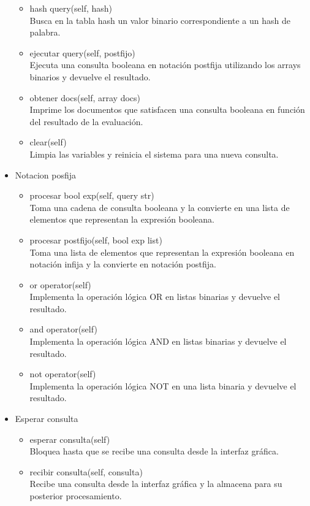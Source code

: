 \begin{itemize}
\begin{itemize}
    \item hash query(self, hash) \\ Busca en la tabla hash un valor binario correspondiente a un hash de palabra.
    \item ejecutar query(self, postfijo) \\ Ejecuta una consulta booleana en notación postfija utilizando los arrays binarios y devuelve el resultado.
    \item obtener docs(self, array docs) \\ Imprime los documentos que satisfacen una consulta booleana en función del resultado de la evaluación.
    \item clear(self) \\ Limpia las variables y reinicia el sistema para una nueva consulta.
  \end{itemize}
  \item Notacion posfija
  \begin{itemize}
    \item procesar bool exp(self, query str) \\ Toma una cadena de consulta booleana y la convierte en una lista de elementos que representan la expresión booleana.
    \item procesar postfijo(self, bool exp list) \\ Toma una lista de elementos que representan la expresión booleana en notación infija y la convierte en notación postfija.
    \item or operator(self) \\ Implementa la operación lógica OR en listas binarias y devuelve el resultado.
    \item and operator(self) \\ Implementa la operación lógica AND en listas binarias y devuelve el resultado.
    \item not operator(self) \\ Implementa la operación lógica NOT en una lista binaria y devuelve el resultado.
  \end{itemize}
  \item Esperar consulta
  \begin{itemize}
    \item esperar consulta(self) \\ Bloquea hasta que se recibe una consulta desde la interfaz gráfica.
    \item recibir consulta(self, consulta) \\ Recibe una consulta desde la interfaz gráfica y la almacena para su posterior procesamiento.

\end{itemize}
\end{itemize}
